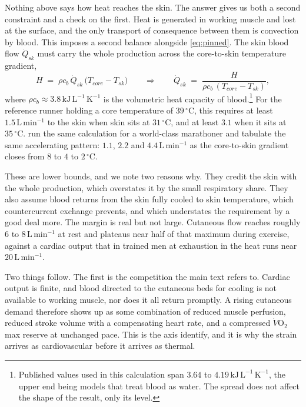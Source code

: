 Nothing above says how heat reaches the skin. The answer gives us both a second
constraint and a check on the first. Heat is generated in working muscle and
lost at the surface, and the only transport of consequence between them is
convection by blood. This imposes a second balance alongside \eqref{eq:pinned}.
The skin blood flow $\dot{Q}_{sk}$ must carry the whole production across the
core-to-skin temperature gradient,
\begin{equation}
  H \;=\; \rho c_b\,\dot{Q}_{sk}\,\bigl(T_{core} - T_{sk}\bigr)
  \qquad\Longrightarrow\qquad
  \dot{Q}_{sk} \;=\; \frac{H}{\rho c_b\,(T_{core} - T_{sk})},
  \label{eq:skbf}
\end{equation}
where $\rho c_b \approx 3.8\,\mathrm{kJ\,L^{-1}\,K^{-1}}$ is the volumetric heat
capacity of blood.\footnote{Published values used in this calculation span
$3.64$ to $4.19\,\mathrm{kJ\,L^{-1}\,K^{-1}}$, the upper end being models that
treat blood as water. The spread does not affect the shape of the result, only
its level.} For the reference runner holding a core temperature of
$39\,^{\circ}$C, this requires at least $1.5\,\mathrm{L\,min^{-1}}$ to the skin
when skin sits at $31\,^{\circ}$C, and at least $3.1$ when it sits at
$35\,^{\circ}$C. \citet{cheuvront2010} run the same calculation for a
world-class marathoner and tabulate the same accelerating pattern: $1.1$, $2.2$
and $4.4\,\mathrm{L\,min^{-1}}$ as the core-to-skin gradient closes from $8$ to
$4$ to $2\,^{\circ}$C.

These are lower bounds, and we note two reasons why. They credit the skin with
the whole production, which overstates it by the small respiratory share. They
also assume blood returns from the skin fully cooled to skin temperature, which
countercurrent exchange prevents, and which understates the requirement by a
good deal more. The margin is real but not large. Cutaneous flow reaches roughly
$6$ to $8\,\mathrm{L\,min^{-1}}$ at rest and plateaus near half of that maximum
during exercise, against a cardiac output that in trained men at exhaustion in
the heat runs near $20\,\mathrm{L\,min^{-1}}$.

Two things follow. The first is the competition the main text refers to. Cardiac
output is finite, and blood directed to the cutaneous beds for cooling is not
available to working muscle, nor does it all return promptly. A rising cutaneous
demand therefore shows up as some combination of reduced muscle perfusion,
reduced stroke volume with a compensating heart rate, and a compressed
$\dot{V}\mathrm{O}_2$max reserve at unchanged pace. This is the axis
\citet{cheuvront2010} identify, and it is why the strain arrives as
cardiovascular before it arrives as thermal.

